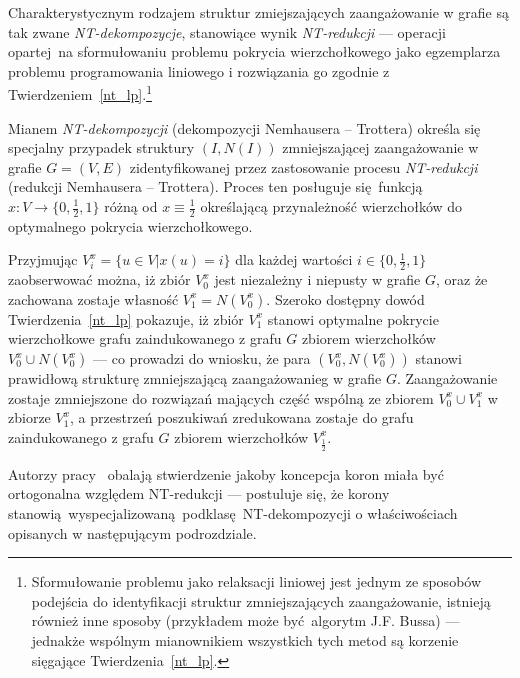 \par{
  Charakterystycznym rodzajem struktur zmiejszających zaangażowanie w grafie są tak zwane \emph{NT-dekompozycje}, stanowiące wynik \emph{NT-redukcji} --- operacji opartej na sformułowaniu problemu pokrycia wierzchołkowego jako egzemplarza problemu programowania liniowego i rozwiązania go zgodnie z Twierdzeniem~\ref{nt_lp}.\footnote{Sformułowanie problemu jako relaksacji liniowej jest jednym ze sposobów podejścia do identyfikacji struktur zmniejszających zaangażowanie, istnieją również inne sposoby (przykładem może być algorytm J.F. Bussa) --- jednakże wspólnym mianownikiem wszystkich tych metod są korzenie sięgające Twierdzenia~\ref{nt_lp}.}
  \begin{definition}
    Mianem \emph{NT-dekompozycji} (dekompozycji Nemhausera -- Trottera) określa się specjalny przypadek struktury $(I, N(I))$ zmniejszającej zaangażowanie w grafie $G=(V, E)$ zidentyfikowanej przez zastosowanie procesu \emph{NT-redukcji} (redukcji Nemhausera -- Trottera).
    Proces ten posługuje się funkcją $x: V \rightarrow \{0, \frac{1}{2}, 1\}$ różną od $x \equiv \frac{1}{2}$ określającą przynależność wierzchołków do optymalnego pokrycia wierzchołkowego.
  \end{definition}
  Przyjmując $V_i^x=\{u \in V| x(u)=i\}$ dla każdej wartości $i\in \{0, \frac{1}{2}, 1\}$ zaobserwować można, iż zbiór $V_0^x$ jest niezależny i niepusty w grafie $G$, oraz że zachowana zostaje własność $V_1^x = N(V_0^x)$.
  Szeroko dostępny dowód Twierdzenia~\ref{nt_lp} pokazuje, iż zbiór $V_1^x$ stanowi optymalne pokrycie wierzchołkowe grafu zaindukowanego z grafu $G$ zbiorem wierzchołków $V_0^x \cup N(V_0^x)$ --- co prowadzi do wniosku, że para $(V_0^x, N(V_0^x))$ stanowi prawidłową strukturę zmniejszającą zaangażowanieg w grafie $G$.
  Zaangażowanie zostaje zmniejszone do rozwiązań mających część wspólną ze zbiorem $V_0^x \cup V_1^x$ w zbiorze $V_1^x$, a przestrzeń poszukiwań zredukowana zostaje do grafu zaindukowanego z grafu $G$ zbiorem wierzchołków $V_\frac{1}{2}^x$.
}
\par{
  Autorzy pracy~\cite{chlebik:crown} obalają stwierdzenie jakoby koncepcja koron miała być ortogonalna względem NT-redukcji --- postuluje się, że korony stanowią wyspecjalizowaną podklasę NT-dekompozycji o właściwościach opisanych w następującym podrozdziale.
}
